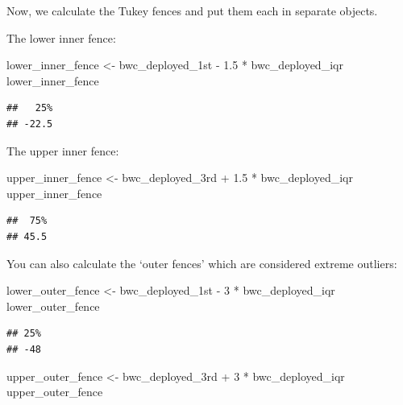 \documentclass[
]{book}
\newenvironment{Shaded}{\begin{snugshade}}{\end{snugshade}}
\newcommand{\DecValTok}[1]{\textcolor[rgb]{0.00,0.00,0.81}{#1}}
\newcommand{\FloatTok}[1]{\textcolor[rgb]{0.00,0.00,0.81}{#1}}
\newcommand{\NormalTok}[1]{#1}
\newcommand{\OtherTok}[1]{\textcolor[rgb]{0.56,0.35,0.01}{#1}}
\newcommand{\SpecialCharTok}[1]{\textcolor[rgb]{0.00,0.00,0.00}{#1}}
\begin{document}
Now, we calculate the Tukey fences and put them each in separate objects.

The lower inner fence:

\begin{Shaded}
\begin{Highlighting}[]
\NormalTok{lower\_inner\_fence }\OtherTok{\textless{}{-}}\NormalTok{ bwc\_deployed\_1st }\SpecialCharTok{{-}} \FloatTok{1.5} \SpecialCharTok{*}\NormalTok{ bwc\_deployed\_iqr }
\NormalTok{lower\_inner\_fence}
\end{Highlighting}
\end{Shaded}

\begin{verbatim}
##   25% 
## -22.5
\end{verbatim}

The upper inner fence:

\begin{Shaded}
\begin{Highlighting}[]
\NormalTok{upper\_inner\_fence }\OtherTok{\textless{}{-}}\NormalTok{ bwc\_deployed\_3rd }\SpecialCharTok{+} \FloatTok{1.5} \SpecialCharTok{*}\NormalTok{ bwc\_deployed\_iqr }
\NormalTok{upper\_inner\_fence}
\end{Highlighting}
\end{Shaded}

\begin{verbatim}
##  75% 
## 45.5
\end{verbatim}

You can also calculate the `outer fences' which are considered extreme outliers:

\begin{Shaded}
\begin{Highlighting}[]
\NormalTok{lower\_outer\_fence }\OtherTok{\textless{}{-}}\NormalTok{ bwc\_deployed\_1st }\SpecialCharTok{{-}} \DecValTok{3} \SpecialCharTok{*}\NormalTok{ bwc\_deployed\_iqr }
\NormalTok{lower\_outer\_fence}
\end{Highlighting}
\end{Shaded}

\begin{verbatim}
## 25% 
## -48
\end{verbatim}

\begin{Shaded}
\begin{Highlighting}[]
\NormalTok{upper\_outer\_fence }\OtherTok{\textless{}{-}}\NormalTok{ bwc\_deployed\_3rd }\SpecialCharTok{+} \DecValTok{3} \SpecialCharTok{*}\NormalTok{ bwc\_deployed\_iqr }
\NormalTok{upper\_outer\_fence}
\end{Highlighting}
\end{Shaded}
\end{document}
